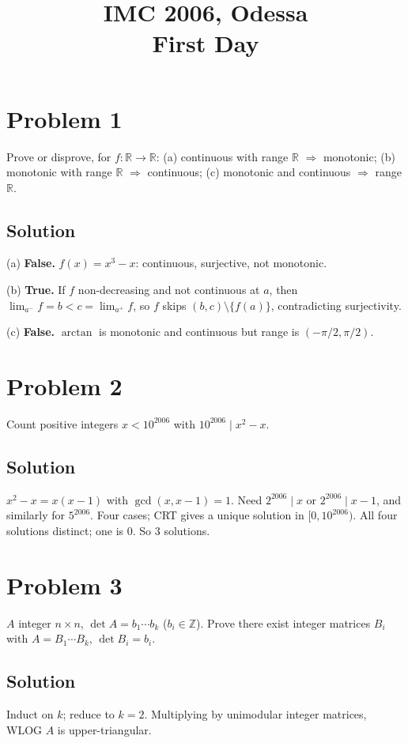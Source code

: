 \documentclass{article}
\title{IMC 2006, Odessa \\ First Day}
\date{}
\begin{document}
\maketitle

\section*{Problem 1}
Prove or disprove, for $f : \mathbb{R} \to \mathbb{R}$:
(a) continuous with range $\mathbb{R}$ $\Rightarrow$ monotonic;
(b) monotonic with range $\mathbb{R}$ $\Rightarrow$ continuous;
(c) monotonic and continuous $\Rightarrow$ range $\mathbb{R}$.

\subsection*{Solution}
(a) \textbf{False.} $f(x) = x^3 - x$: continuous, surjective, not monotonic.

(b) \textbf{True.} If $f$ non-decreasing and not continuous at $a$, then $\lim_{a^-} f = b < c = \lim_{a^+} f$, so $f$ skips $(b, c) \setminus \{f(a)\}$, contradicting surjectivity.

(c) \textbf{False.} $\arctan$ is monotonic and continuous but range is $(-\pi/2, \pi/2)$.

\section*{Problem 2}
Count positive integers $x < 10^{2006}$ with $10^{2006} \mid x^2 - x$.

\subsection*{Solution}
$x^2 - x = x(x-1)$ with $\gcd(x, x-1) = 1$. Need $2^{2006} \mid x$ or $2^{2006} \mid x - 1$, and similarly for $5^{2006}$. Four cases; CRT gives a unique solution in $[0, 10^{2006})$. All four solutions distinct; one is $0$. So $3$ solutions.

\section*{Problem 3}
$A$ integer $n \times n$, $\det A = b_1 \cdots b_k$ ($b_i \in \mathbb{Z}$). Prove there exist integer matrices $B_i$ with $A = B_1 \cdots B_k$, $\det B_i = b_i$.

\subsection*{Solution}
Induct on $k$; reduce to $k = 2$. Multiplying by unimodular integer matrices, WLOG $A$ is upper-triangular.
\end{document}
